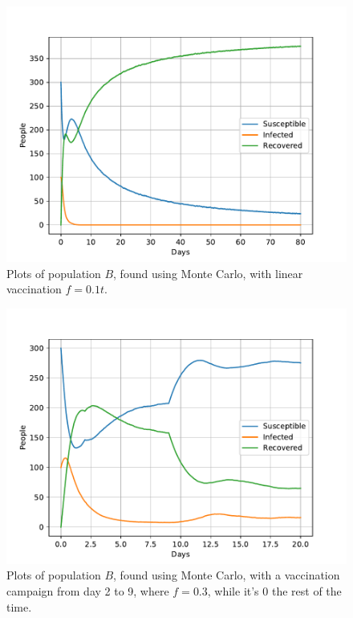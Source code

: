 \documentclass[a4paper]{article}
\begin{document}
	\begin{figure}[!htb]
		\centering 
		\includegraphics[scale=0.56]{../plots/opp_e_B2_MC.pdf}	
		\caption{Plots of population $B$, found using Monte Carlo, with linear vaccination $f=0.1 t$.}
		\label{opp_e1_MC}
	\end{figure}
	
	\begin{figure}[!htb]
		\centering 
		\includegraphics[scale=0.56]{../plots/opp_e_fb_MC.pdf}	
		\caption{Plots of population $B$, found using Monte Carlo, with a vaccination campaign from day 2 to 9, where $f=0.3$, while it's 0 the rest of the time.}
		\label{opp_e2_MC}
	\end{figure}
\end{document}

